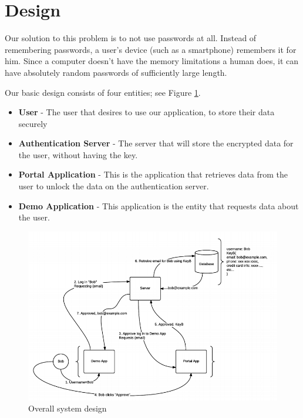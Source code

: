 \documentclass[letterpaper,twocolumn,10pt]{article}
\begin{document}
\section{Design}

Our solution to this problem is to not use passwords at all. Instead of remembering passwords, a user's device (such as a smartphone) remembers it for him. Since a computer doesn't have the memory limitations a human does, it can have absolutely random passwords of sufficiently large length. 

Our basic design consists of four entities; see Figure \ref{design}.
\begin{itemize}
    \item \textbf{User} - The user that desires to use our application, to store their data securely
    \item \textbf{Authentication Server} - The server that will store the encrypted data for the user, without having the key.
    \item \textbf{Portal Application} - This is the application that retrieves data from the user to unlock the data on the authentication server.
    \item \textbf{Demo Application} - This application is the entity that requests data about the user.
\end{itemize}

\begin{figure}[ht]
\centering
\includegraphics[width=\textwidth]{Design}
\caption{Overall system design}
\label{design}
\end{figure}
\end{document}
